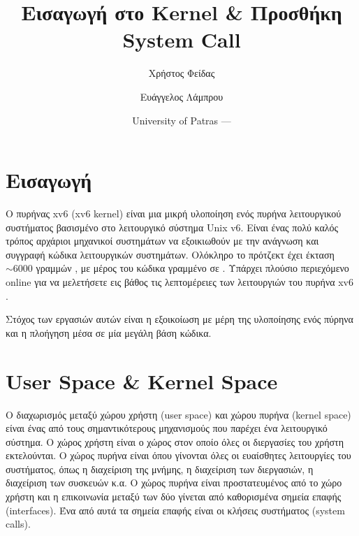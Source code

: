\documentclass[18pt]{extarticle}
\title{Εισαγωγή στο \src{xv6} Kernel \& Προσθήκη System Call} %
\author{\footnotesize Χρήστος Φείδας\\ \footnotesize \src{fidas@upatras.gr} \and \footnotesize Ευάγγελος Λάμπρου\\ \footnotesize \src{e.lamprou@upnet.gr}} %
\date{University of Patras --- \the\year{}} %
\begin{document}
\pagestyle{fancy}
\fancyhf{} %
\renewcommand{\headrulewidth}{0pt}
\fancyhead{} %
\fancyfoot{} %
\fancyfoot[L]{}
\fancyfoot[R]{\thepage}

\maketitle



\section{Εισαγωγή}

Ο πυρήνας xv6 (xv6 kernel) \cite{xv6Kernel} είναι μια μικρή υλοποίηση ενός πυρήνα λειτουργικού 
συστήματος βασισμένο στο λειτουργικό σύστημα Unix v6.
Είναι ένας πολύ καλός τρόπος αρχάριοι μηχανικοί συστημάτων να εξοικιωθούν με την ανάγνωση και συγγραφή 
κώδικα λειτουργικών συστημάτων. Ολόκληρο το πρότζεκτ έχει έκταση $\sim 6000$ γραμμών 
, με μέρος του κώδικα γραμμένο σε .
Υπάρχει πλούσιο περιεχόμενο online για να μελετήσετε εις βάθος τις λεπτομέρειες
των λειτουργιών του πυρήνα xv6 \cite{xv6VideoSeries, xv6Book}.

Στόχος των εργασιών αυτών είναι η εξοικοίωση με μέρη της υλοποίησης ενός πύρηνα και
η πλοήγηση μέσα σε μία μεγάλη βάση κώδικα.

\section{User Space \& Kernel Space}

Ο διαχωρισμός μεταξύ χώρου χρήστη (user space) και χώρου πυρήνα (kernel space) είναι ένας από τους
σημαντικότερους μηχανισμούς που παρέχει ένα λειτουργικό σύστημα. Ο χώρος χρήστη είναι ο χώρος
στον οποίο όλες οι διεργασίες του χρήστη εκτελούνται. Ο χώρος πυρήνα είναι όπου γίνονται 
όλες οι ευαίσθητες λειτουργίες του συστήματος, όπως η διαχείριση της μνήμης, η διαχείριση των
διεργασιών, η διαχείριση των συσκευών κ.α. Ο χώρος πυρήνα είναι προστατευμένος από το χώρο χρήστη
και η επικοινωνία μεταξύ των δύο γίνεται από καθορισμένα σημεία επαφής (interfaces).
Ένα από αυτά τα σημεία επαφής είναι οι κλήσεις συστήματος (system calls).
\end{document}
